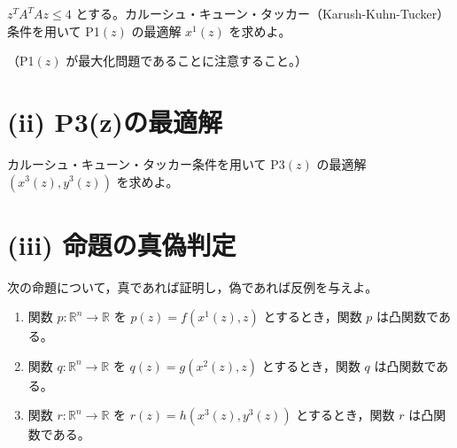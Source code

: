 \documentclass[12pt,a4paper]{article}
\begin{document}
$z^T A^T A z \leq 4$ とする。カルーシュ・キューン・タッカー（Karush-Kuhn-Tucker）条件を用いて P1$(z)$ の最適解 $x^1(z)$ を求めよ。

（P1$(z)$ が最大化問題であることに注意すること。）

\section*{(ii) P3(z)の最適解}

カルーシュ・キューン・タッカー条件を用いて P3$(z)$ の最適解 $(x^3(z), y^3(z))$ を求めよ。

\section*{(iii) 命題の真偽判定}

次の命題について，真であれば証明し，偽であれば反例を与えよ。

\begin{enumerate}
\item[(a)] 関数 $p: \mathbb{R}^n \to \mathbb{R}$ を $p(z) = f(x^1(z), z)$ とするとき，関数 $p$ は凸関数である。

\item[(b)] 関数 $q: \mathbb{R}^n \to \mathbb{R}$ を $q(z) = g(x^2(z), z)$ とするとき，関数 $q$ は凸関数である。

\item[(c)] 関数 $r: \mathbb{R}^n \to \mathbb{R}$ を $r(z) = h(x^3(z), y^3(z))$ とするとき，関数 $r$ は凸関数である。
\end{enumerate}
\end{document}
